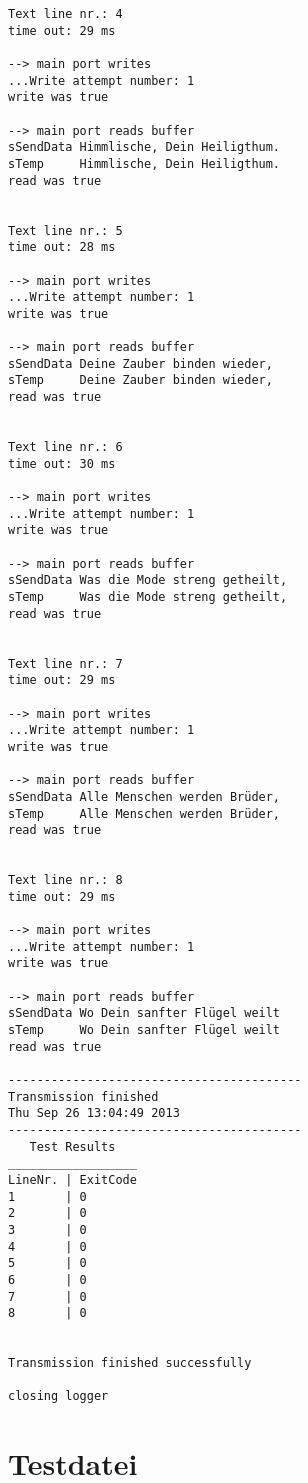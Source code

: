 \begin{lstlisting}
Text line nr.: 4
time out: 29 ms

--> main port writes
...Write attempt number: 1
write was true

--> main port reads buffer
sSendData Himmlische, Dein Heiligthum.
sTemp     Himmlische, Dein Heiligthum.
read was true


Text line nr.: 5
time out: 28 ms

--> main port writes
...Write attempt number: 1
write was true

--> main port reads buffer
sSendData Deine Zauber binden wieder,
sTemp     Deine Zauber binden wieder,
read was true


Text line nr.: 6
time out: 30 ms

--> main port writes
...Write attempt number: 1
write was true

--> main port reads buffer
sSendData Was die Mode streng getheilt,
sTemp     Was die Mode streng getheilt,
read was true


Text line nr.: 7
time out: 29 ms

--> main port writes
...Write attempt number: 1
write was true

--> main port reads buffer
sSendData Alle Menschen werden Brüder,
sTemp     Alle Menschen werden Brüder,
read was true


Text line nr.: 8
time out: 29 ms

--> main port writes
...Write attempt number: 1
write was true

--> main port reads buffer
sSendData Wo Dein sanfter Flügel weilt
sTemp     Wo Dein sanfter Flügel weilt
read was true

-----------------------------------------
Transmission finished
Thu Sep 26 13:04:49 2013
-----------------------------------------
   Test Results   
__________________
LineNr. | ExitCode
1       | 0
2       | 0
3       | 0
4       | 0
5       | 0
6       | 0
7       | 0
8       | 0


Transmission finished successfully

closing logger

\end{lstlisting}

\newpage
\section{Testdatei}\label{TestDatei}

